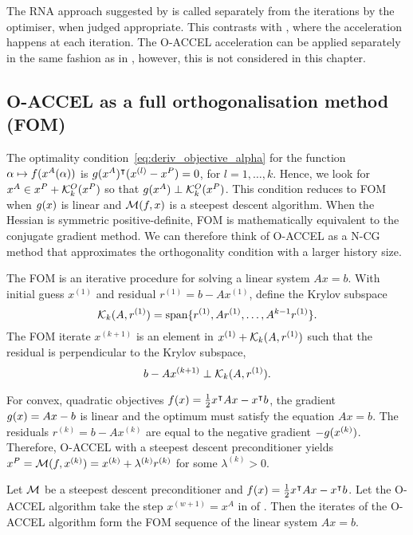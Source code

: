 \documentclass[main.tex]{subfiles}
\begin{document}
\begin{remark}
  The RNA approach suggested by \citet{damien2016regularized} is
  called separately from the iterations by the optimiser, when judged
  appropriate. This contrasts with , where the
  acceleration happens at each iteration.  The O-ACCEL acceleration
  can be applied separately in the same fashion as in
  \citet{damien2016regularized}, however, this is not considered in
  this chapter.
\end{remark}

\subsection{O-ACCEL as a full orthogonalisation method (FOM)}
The optimality condition~\eqref{eq:deriv_objective_alpha} for the
function $\alpha\mapsto f(x^A(\alpha))$ is
$g(x^A)^\intercal(x^{(l)}-x^P)=0$, for $l=1,\dots,k$.  Hence, we
look for $x^A\in x^P+\mathcal{K}_{k}^O(x^P)$ so that
$g(x^A)\perp \mathcal{K}_{k}^O(x^P)$.  This condition reduces to FOM
\citep{saad2003iterative} when $g(x)$ is linear and
$\mathcal{M}(f,x)$ is a steepest descent algorithm.  When the Hessian
is symmetric positive-definite, FOM is mathematically equivalent to
the conjugate gradient method. We can therefore think of O-ACCEL as a
N-CG method that approximates the orthogonality condition with a
larger history size.

The FOM is an iterative procedure for solving a linear system $Ax=b$.
With initial guess $x^{(1)}$ and residual $r^{(1)}=b-Ax^{(1)}$, define
the Krylov subspace
\begin{equation}
  \mathcal{K}_{k}(A,r^{(1)})=\mbox{span} \{r^{(1)},Ar^{(1)},\dots,A^{k-1}r^{(1)}\}.
\end{equation}
The FOM iterate $x^{(k+1)}$ is an element in $x^{(1)}+\mathcal{K}_{k}(A,r^{(1)})$
such that the residual is perpendicular to the Krylov subspace,
\begin{equation}
  b-Ax^{(k+1)}\perp \mathcal{K}_{k}(A,r^{(1)}).
\end{equation}

For convex, quadratic objectives
$f(x)=\frac{1}{2}x^\intercal Ax-x^\intercal b$, the gradient
$g(x)=Ax-b$ is linear and the optimum must satisfy the equation
$Ax=b$.  The residuals $r^{(k)}=b-Ax^{(k)}$ are equal to the negative
gradient $-g(x^{(k)})$. Therefore, O-ACCEL with a steepest descent
preconditioner yields
$x^P = \mathcal{M}(f,x^{(k)}) = x^{(k)}+\lambda^{(k)}r^{(k)}$ for some
$\lambda^{(k)}>0$.

\begin{theorem}\label{thm:oaccel_fom}
  Let $\mathcal{M}$ be a steepest descent preconditioner and
  $f(x)=\frac{1}{2}x^\intercal Ax-x^\intercal b$.  Let the
  O-ACCEL algorithm take the step $x^{(w+1)}=x^A$ in
   of .  Then the iterates of
  the O-ACCEL algorithm form the FOM sequence of the linear system
  $Ax=b$.
\end{theorem}
\end{document}
